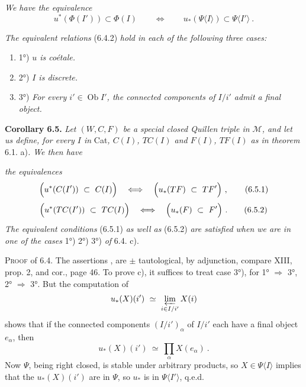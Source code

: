  \textit{We have the equivalence}
\[
u^*(\Phi(I')) \subset \Phi(I) \qquad\Longleftrightarrow\qquad u_*(\Psi\langle I\rangle) \subset \Psi\langle I'\rangle\ .
\tag*{(6.4.2)}
\]

 \textit{The equivalent relations} (6.4.2) \textit{hold in each of the following three cases:}
\begin{enumerate}[label={}, leftmargin=2.5em]
\item 1°) \textit{$u$ is coétale.}
\item 2°) \textit{$I$ is discrete.}
\item 3°) \textit{For every $i' \in \operatorname{Ob} I'$, the connected components of $I/i'$ admit a final object.}
\end{enumerate}

\newpage
{}

\textbf{Corollary 6.5.} \textit{Let $(W,C,F)$ be a special closed Quillen triple in $\mathcal{M}$, and let us define, for every $I$ in} Cat\textit{, $C(I)$, $TC(I)$ and $F(I)$, $TF(I)$ as in theorem} 6.1. a)\textit{. We then have}


\textit{the equivalences}
\[
\Bigl(u^*(C(I'))\ \subset\ C(I)\Bigr) \quad\Longleftrightarrow\quad \Bigl(u_*(TF)\ \subset\ TF'\Bigr)\ ,
\tag*{(6.5.1)}
\]
\[
\Bigl(u^*(TC(I'))\ \subset\ TC(I)\Bigr) \quad\Longleftrightarrow\quad \Bigl(u_*(F)\ \subset\ F'\Bigr)\ .
\tag*{(6.5.2)}
\]
\textit{The equivalent conditions} (6.5.1) \textit{as well as} (6.5.2) \textit{are satisfied when we are in one of the cases} 1°) 2°) 3°) \textit{of} 6.4. c).

\textsc{Proof} of 6.4. The assertions  ,  are $\pm$ tautological, by adjunction, compare XIII, prop. 2, and cor., page 46. To prove c), it suffices to treat case 3°), for 1° $\Longrightarrow$ 3°, 2° $\Longrightarrow$ 3°. But the computation of
\[
u_*(X)(i')\ \simeq\ \varprojlim_{i\in I/i'} X(i)
\]
shows that if the connected components $(I/i')_\alpha$ of $I/i'$ each have a final object $e_\alpha$, then
\[
u_*(X)(i')\ \simeq\ \prod_\alpha X(e_\alpha)\ .
\]
Now $\Psi$, being right closed, is stable under arbitrary products, so $X \in \Psi\langle I\rangle$ implies that the $u_*(X)(i')$ are in $\Psi$, so $u_*$ is in $\Psi\langle I'\rangle$, q.e.d.